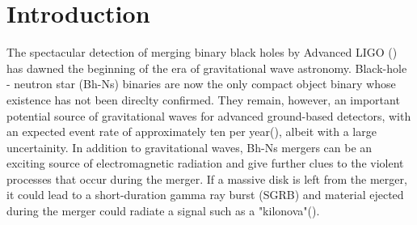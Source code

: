 

\section{Introduction}

The spectacular detection of merging binary black holes by Advanced
LIGO (\cite{Abbott:2016blz}) has dawned the beginning of the era of gravitational wave astronomy. Black-hole - neutron star (Bh-Ns) binaries are now the only compact object binary whose existence has not been direclty confirmed. They remain, however, an important potential source of gravitational waves for advanced ground-based detectors, with an expected event rate of approximately ten per year(\cite{AbadieLSC:2010}), albeit with a large uncertainity. In addition to gravitational waves, Bh-Ns mergers can be an exciting source of electromagnetic radiation and give further clues to the violent processes that occur during the merger. If a massive disk is left from the merger, it could lead to a short-duration gamma ray burst (SGRB) and material ejected during the merger could radiate a signal such as a "kilonova"(\cite{metzger:11}).

